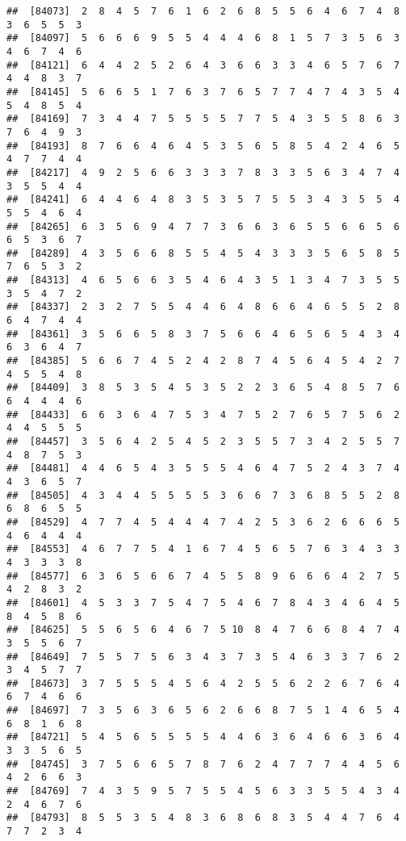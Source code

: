 \documentclass[
]{book}
\begin{document}
\begin{verbatim}
##  [84073]  2  8  4  5  7  6  1  6  2  6  8  5  5  6  4  6  7  4  8  3  6  5  5  3
##  [84097]  5  6  6  6  9  5  5  4  4  4  6  8  1  5  7  3  5  6  3  4  6  7  4  6
##  [84121]  6  4  4  2  5  2  6  4  3  6  6  3  3  4  6  5  7  6  7  4  4  8  3  7
##  [84145]  5  6  6  5  1  7  6  3  7  6  5  7  7  4  7  4  3  5  4  5  4  8  5  4
##  [84169]  7  3  4  4  7  5  5  5  5  7  7  5  4  3  5  5  8  6  3  7  6  4  9  3
##  [84193]  8  7  6  6  4  6  4  5  3  5  6  5  8  5  4  2  4  6  5  4  7  7  4  4
##  [84217]  4  9  2  5  6  6  3  3  3  7  8  3  3  5  6  3  4  7  4  3  5  5  4  4
##  [84241]  6  4  4  6  4  8  3  5  3  5  7  5  5  3  4  3  5  5  4  5  5  4  6  4
##  [84265]  6  3  5  6  9  4  7  7  3  6  6  3  6  5  5  6  6  5  6  6  5  3  6  7
##  [84289]  4  3  5  6  6  8  5  5  4  5  4  3  3  3  5  6  5  8  5  7  6  5  3  2
##  [84313]  4  6  5  6  6  3  5  4  6  4  3  5  1  3  4  7  3  5  5  3  5  4  7  2
##  [84337]  2  3  2  7  5  5  4  4  6  4  8  6  6  4  6  5  5  2  8  6  4  7  4  4
##  [84361]  3  5  6  6  5  8  3  7  5  6  6  4  6  5  6  5  4  3  4  6  3  6  4  7
##  [84385]  5  6  6  7  4  5  2  4  2  8  7  4  5  6  4  5  4  2  7  4  5  5  4  8
##  [84409]  3  8  5  3  5  4  5  3  5  2  2  3  6  5  4  8  5  7  6  6  4  4  4  6
##  [84433]  6  6  3  6  4  7  5  3  4  7  5  2  7  6  5  7  5  6  2  4  4  5  5  5
##  [84457]  3  5  6  4  2  5  4  5  2  3  5  5  7  3  4  2  5  5  7  4  8  7  5  3
##  [84481]  4  4  6  5  4  3  5  5  5  4  6  4  7  5  2  4  3  7  4  4  3  6  5  7
##  [84505]  4  3  4  4  5  5  5  5  3  6  6  7  3  6  8  5  5  2  8  6  8  6  5  5
##  [84529]  4  7  7  4  5  4  4  4  7  4  2  5  3  6  2  6  6  6  5  4  6  4  4  4
##  [84553]  4  6  7  7  5  4  1  6  7  4  5  6  5  7  6  3  4  3  3  4  3  3  3  8
##  [84577]  6  3  6  5  6  6  7  4  5  5  8  9  6  6  6  4  2  7  5  4  2  8  3  2
##  [84601]  4  5  3  3  7  5  4  7  5  4  6  7  8  4  3  4  6  4  5  8  4  5  8  6
##  [84625]  5  5  6  5  6  4  6  7  5 10  8  4  7  6  6  8  4  7  4  3  5  5  6  7
##  [84649]  7  5  5  7  5  6  3  4  3  7  3  5  4  6  3  3  7  6  2  3  4  5  7  7
##  [84673]  3  7  5  5  5  4  5  6  4  2  5  5  6  2  2  6  7  6  4  6  7  4  6  6
##  [84697]  7  3  5  6  3  6  5  6  2  6  6  8  7  5  1  4  6  5  4  6  8  1  6  8
##  [84721]  5  4  5  6  5  5  5  5  4  4  6  3  6  4  6  6  3  6  4  3  3  5  6  5
##  [84745]  3  7  5  6  6  5  7  8  7  6  2  4  7  7  7  4  4  5  6  4  2  6  6  3
##  [84769]  7  4  3  5  9  5  7  5  5  4  5  6  3  3  5  5  4  3  4  2  4  6  7  6
##  [84793]  8  5  5  3  5  4  8  3  6  8  6  8  3  5  4  4  7  6  4  7  7  2  3  4

\end{verbatim}
\end{document}
